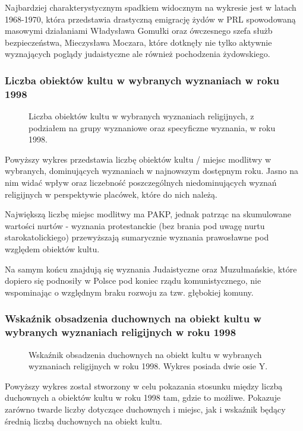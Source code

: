 \documentclass[12pt]{article}
\begin{document}
Najbardziej charakterystycznym spadkiem widocznym na wykresie jest w latach 1968-1970, która przedstawia drastyczną emigrację żydów w PRL spowodowaną masowymi działaniami Władysława Gomułki
oraz ówczesnego szefa służb bezpieczeństwa, Mieczysława Moczara, które dotknęły nie tylko aktywnie wyznających poglądy judaistyczne ale również pochodzenia żydowskiego.      


\subsubsection{Liczba obiektów kultu w wybranych wyznaniach w roku 1998}
\begin{figure}[H]
    
    \caption{Liczba obiektów kultu w wybranych wyznaniach religijnych, z podziałem na grupy wyznaniowe oraz specyficzne wyznania, w roku 1998.}
\end{figure}

Powyższy wykres przedstawia liczbę obiektów kultu / miejsc modlitwy w wybranych, dominujących wyznaniach w najnowszym dostępnym roku. Jasno na nim widać wpływ oraz liczebność poszczególnych 
niedominujących wyznań religijnych w perspektywie placówek, które do nich należą. 

Największą liczbę miejsc modlitwy ma PAKP, jednak patrząc na skumulowane wartości nurtów - wyznania protestanckie (bez brania pod uwagę nurtu starokatolickiego) przewyższają sumarycznie
wyznania prawosławne pod względem obiektów kultu. 

Na samym końcu znajdują się wyznania Judaistyczne oraz Muzułmańskie, które dopiero się podnosiły w Polsce pod koniec rządu komunistycznego, nie wspominając o względnym braku rozwoju za tzw. głębokiej komuny. 


\subsubsection{Wskaźnik obsadzenia duchownych na obiekt kultu w wybranych wyznaniach religijnych w roku 1998}
\begin{figure}[H]
    
    \caption{Wskaźnik obsadzenia duchownych na obiekt kultu w wybranych wyznaniach religijnych w roku 1998. Wykres posiada dwie osie Y.}
\end{figure}

Powyższy wykres został stworzony w celu pokazania stosunku między liczbą duchownych a obiektów kultu w roku 1998 tam, gdzie to możliwe. Pokazuje zarówno twarde liczby dotyczące duchownych i miejsc, 
jak i wskaźnik będący średnią liczbą duchownych na obiekt kultu.
\end{document}

